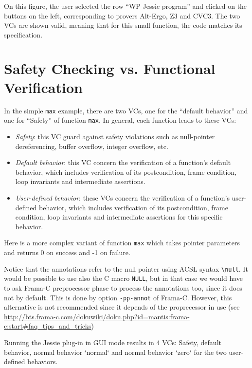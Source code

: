 \documentclass[a4paper,11pt,twoside,openright]{report}
\begin{document}
On this figure, the user selected the row ``WP Jessie program'' and
clicked on the buttons on the left, corresponding to provers Alt-Ergo,
Z3 and CVC3. The two VCs are shown valid, meaning that for this small
function, the code matches its specification.

\section{Safety Checking vs. Functional Verification}

In the simple \verb|max| example, there are two VCs, one for the
``default behavior'' and one for ``Safety'' of function \verb|max|. In
general, each function leads to these VCs:
\begin{itemize}
\item \textit{Safety}: this VC guard against safety violations
  such as null-pointer dereferencing, buffer overflow, integer overflow, etc.
\item \textit{Default behavior}: this VC concern the
  verification of a function's default behavior, which includes
  verification of its postcondition, frame condition, loop invariants
  and intermediate assertions.
\item \textit{User-defined behavior}: these VCs concern the
  verification of a function's user-defined behavior, which includes
  verification of its postcondition, frame condition, loop invariants
  and intermediate assertions for this specific behavior.
\end{itemize}

Here is a more complex variant of function \verb|max| which takes
pointer parameters and returns 0 on success and -1 on failure.



Notice that the annotations refer to the null pointer using ACSL
syntax \verb|\null|. It would be possible to use also the C macro
\texttt{NULL}, but in that case we would have to ask Frama-C
preprocessor phase to process the annotations too, since it does not
by default. This is done by option \verb|-pp-annot| of
Frama-C. However, this alternative is not recommended since it 
depends of the proprecessor in use (see
\url{http://bts.frama-c.com/dokuwiki/doku.php?id=mantis:frama-c:start#faq_tips_and_tricks})

Running the Jessie plug-in in GUI mode results in 4 VCs:
Safety, default behavior, normal behavior `normal` and normal behavior
`zero` for the two user-defined behaviors.
\end{document}
